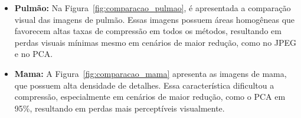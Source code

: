 \begin{itemize}
    \item \textbf{Pulmão:} Na Figura~\ref{fig:comparacao_pulmao}, é apresentada a comparação visual das imagens de pulmão. Essas imagens possuem áreas homogêneas que favorecem altas taxas de compressão em todos os métodos, resultando em perdas visuais mínimas mesmo em cenários de maior redução, como no \acrshort{JPEG} e no \acrshort{PCA}.
    \begin{figure}[H]
        \centering
    \end{figure}
    \item \textbf{Mama:} A Figura~\ref{fig:comparacao_mama} apresenta as imagens de mama, que possuem alta densidade de detalhes. Essa característica dificultou a compressão, especialmente em cenários de maior redução, como o \acrshort{PCA} em 95\%, resultando em perdas mais perceptíveis visualmente.
    \begin{figure}[H]
        \centering
\end{figure}
\end{itemize}
